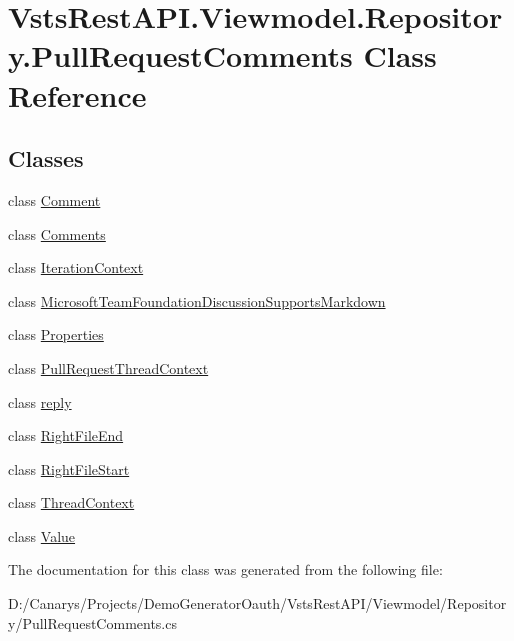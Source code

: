 \hypertarget{class_vsts_rest_a_p_i_1_1_viewmodel_1_1_repository_1_1_pull_request_comments}{}\section{Vsts\+Rest\+A\+P\+I.\+Viewmodel.\+Repository.\+Pull\+Request\+Comments Class Reference}
\label{class_vsts_rest_a_p_i_1_1_viewmodel_1_1_repository_1_1_pull_request_comments}
\subsection*{Classes}
\begin{DoxyCompactItemize}
\item 
class \mbox{\hyperlink{class_vsts_rest_a_p_i_1_1_viewmodel_1_1_repository_1_1_pull_request_comments_1_1_comment}{Comment}}
\item 
class \mbox{\hyperlink{class_vsts_rest_a_p_i_1_1_viewmodel_1_1_repository_1_1_pull_request_comments_1_1_comments}{Comments}}
\item 
class \mbox{\hyperlink{class_vsts_rest_a_p_i_1_1_viewmodel_1_1_repository_1_1_pull_request_comments_1_1_iteration_context}{Iteration\+Context}}
\item 
class \mbox{\hyperlink{class_vsts_rest_a_p_i_1_1_viewmodel_1_1_repository_1_1_pull_request_comments_1_1_microsoft_team_cdef9adbd80bdee012c89b0dd9ec0a8e}{Microsoft\+Team\+Foundation\+Discussion\+Supports\+Markdown}}
\item 
class \mbox{\hyperlink{class_vsts_rest_a_p_i_1_1_viewmodel_1_1_repository_1_1_pull_request_comments_1_1_properties}{Properties}}
\item 
class \mbox{\hyperlink{class_vsts_rest_a_p_i_1_1_viewmodel_1_1_repository_1_1_pull_request_comments_1_1_pull_request_thread_context}{Pull\+Request\+Thread\+Context}}
\item 
class \mbox{\hyperlink{class_vsts_rest_a_p_i_1_1_viewmodel_1_1_repository_1_1_pull_request_comments_1_1reply}{reply}}
\item 
class \mbox{\hyperlink{class_vsts_rest_a_p_i_1_1_viewmodel_1_1_repository_1_1_pull_request_comments_1_1_right_file_end}{Right\+File\+End}}
\item 
class \mbox{\hyperlink{class_vsts_rest_a_p_i_1_1_viewmodel_1_1_repository_1_1_pull_request_comments_1_1_right_file_start}{Right\+File\+Start}}
\item 
class \mbox{\hyperlink{class_vsts_rest_a_p_i_1_1_viewmodel_1_1_repository_1_1_pull_request_comments_1_1_thread_context}{Thread\+Context}}
\item 
class \mbox{\hyperlink{class_vsts_rest_a_p_i_1_1_viewmodel_1_1_repository_1_1_pull_request_comments_1_1_value}{Value}}
\end{DoxyCompactItemize}


The documentation for this class was generated from the following file\+:\begin{DoxyCompactItemize}
\item 
D\+:/\+Canarys/\+Projects/\+Demo\+Generator\+Oauth/\+Vsts\+Rest\+A\+P\+I/\+Viewmodel/\+Repository/Pull\+Request\+Comments.\+cs\end{DoxyCompactItemize}
